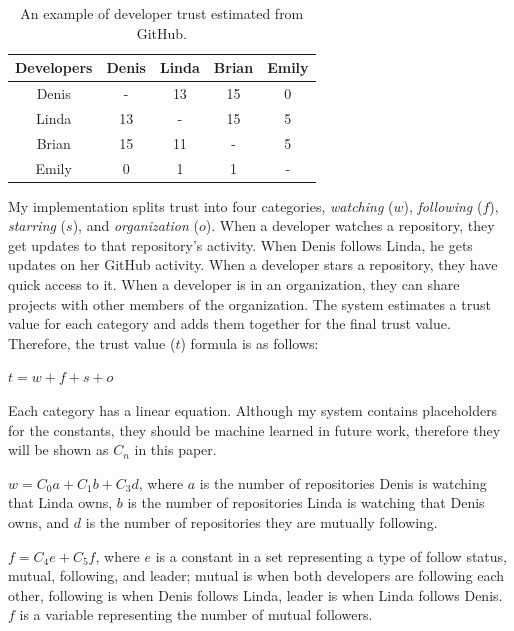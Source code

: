 \documentclass{acm_proc_article-sp}
\begin{document}
  \begin{table}[t]
    \centering
    \begin{tabular}{| c | c | c | c | c |}
      \hline
      Developers  & Denis  & Linda  & Brian  & Emily  \\ \hline
      Denis       & -    & 13     & 15     & 0      \\ \hline
      Linda       & 13     & -    & 15     & 5      \\ \hline
      Brian       & 15     & 11     & -    & 5      \\ \hline
      Emily       & 0      & 1      & 1      & -    \\ \hline
    \end{tabular}
    \caption{An example of developer trust estimated from GitHub.}
    \label{tab:trust}
  \end{table}
  
  My implementation splits trust into four categories, \textit{watching} ($w$), \textit{following} ($f$), \textit{starring} ($s$), and \textit{organization} ($o$). When a developer watches a repository, they get updates to that repository's activity. When Denis follows Linda, he gets updates on her GitHub activity. When a developer stars a repository, they have quick access to it. When a developer is in an organization, they can share projects with other members of the organization. The system estimates a trust value for each category and adds them together for the final trust value. Therefore, the trust value ($t$) formula is as follows:

  \begin{center}
    $ t = w + f + s + o $
  \end{center}

  Each category has a linear equation. Although my system contains placeholders for the constants, they should be machine learned in future work, therefore they will be shown as $ C_n $ in this paper.

  $ w = C_0a + C_1b + C_3d $, where $a$ is the number of repositories Denis is watching that Linda owns, $b$ is the number of repositories Linda is watching that Denis owns, and $d$ is the number of repositories they are mutually following.

  $ f = C_4e + C_5f $, where $e$ is a constant in a set representing a type of follow status, mutual, following, and leader; mutual is when both developers are following each other, following is when Denis follows Linda, leader is when Linda follows Denis. $f$ is a variable representing the number of mutual followers.
\end{document}
